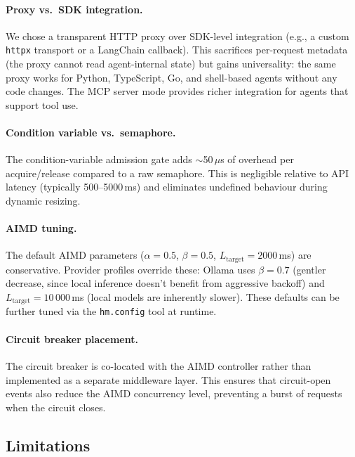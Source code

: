 \documentclass[11pt,twocolumn]{article}
\newcommand{\tool}[1]{\texttt{#1}}
\begin{document}
\paragraph{Proxy vs.\ SDK integration.}
We chose a transparent HTTP proxy over SDK-level integration
(e.g., a custom \texttt{httpx} transport or a LangChain
callback).  This sacrifices per-request metadata (the proxy
cannot read agent-internal state) but gains universality: the
same proxy works for Python, TypeScript, Go, and shell-based
agents without any code changes.  The MCP server mode provides
richer integration for agents that support tool use.

\paragraph{Condition variable vs.\ semaphore.}
The condition-variable admission gate adds ${\sim}$50\,$\mu$s of
overhead per acquire/release compared to a raw semaphore.  This
is negligible relative to API latency (typically 500--5000\,ms)
and eliminates undefined behaviour during dynamic resizing.

\paragraph{AIMD tuning.}
The default AIMD parameters ($\alpha = 0.5$, $\beta = 0.5$,
$L_{\text{target}} = 2000$\,ms) are conservative.  Provider
profiles override these: Ollama uses $\beta = 0.7$ (gentler
decrease, since local inference doesn't benefit from aggressive
backoff) and $L_{\text{target}} = 10\,000$\,ms (local models
are inherently slower).  These defaults can be further tuned
via the \tool{hm.config} tool at runtime.

\paragraph{Circuit breaker placement.}
The circuit breaker is co-located with the AIMD controller
rather than implemented as a separate middleware layer.  This
ensures that circuit-open events also reduce the AIMD
concurrency level, preventing a burst of requests when the
circuit closes.

\subsection{Limitations}
\end{document}
